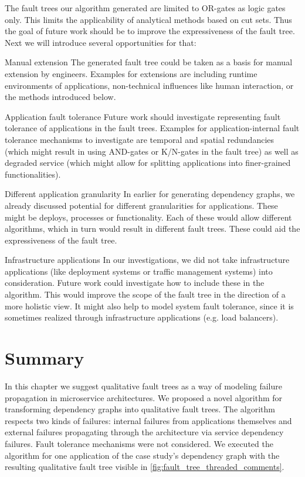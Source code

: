 The fault trees our algorithm generated are limited to OR-gates as logic gates only. This limits the applicability of analytical methods based on cut sets. Thus the goal of future work should be to improve the expressiveness of the fault tree. Next we will introduce several opportunities for that:
\begin{tdescription}
  \item[Manual extension] The generated fault tree could be taken as a basis for manual extension by engineers. Examples for extensions are including runtime environments of applications, non-technical influences like human interaction, or the methods introduced below.
    \item[Application fault tolerance] Future work should investigate representing fault tolerance of applications in the fault trees. Examples for application-internal fault tolerance mechanisms to investigate are temporal and spatial redundancies (which might result in using AND-gates or K/N-gates in the fault tree) as well as degraded service (which might allow for splitting applications into finer-grained functionalities).
    \item[Different application granularity] In earlier  for generating dependency graphs, we already discussed potential for different granularities for applications. These might be deploys, processes or functionality. Each of these would allow different algorithms, which in turn would result in different fault trees. These could aid the expressiveness of the fault tree.
    \item[Infrastructure applications] In our investigations, we did not take infrastructure applications (like deployment systems or traffic management systems) into consideration. Future work could investigate how to include these in the algorithm. This would improve the scope of the fault tree in the direction of a more holistic view. It might also help to model system fault tolerance, since it is sometimes realized through infrastructure applications (e.g. load balancers).
\end{tdescription}

\section{Summary}

In this chapter we suggest qualitative fault trees as a way of modeling failure propagation in microservice architectures. We proposed a novel algorithm for transforming dependency graphs into qualitative fault trees. The algorithm respects two kinds of failures: internal failures from applications themselves and external failures propagating through the architecture via service dependency failures. Fault tolerance mechanisms were not considered. We executed the algorithm for one application of the case study's dependency graph with the resulting qualitative fault tree visible in \ref{fig:fault_tree_threaded_comments}.